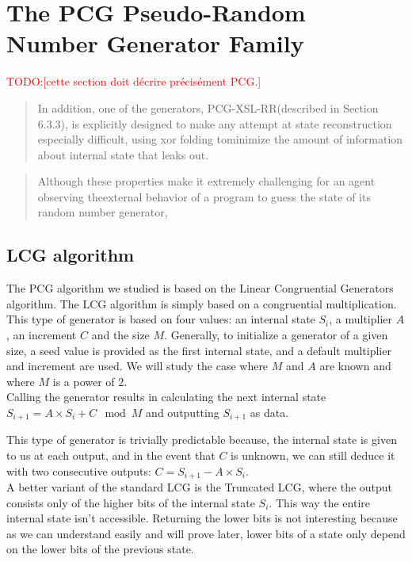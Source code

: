 \documentclass[preprint]{iacrtrans}
\newcommand{\todo}[1]{\textcolor{red}{TODO:[#1]}}
\begin{document}
\section{The PCG Pseudo-Random Number Generator Family}

\todo{cette section doit décrire précisément PCG.}

\begin{quote}
  In addition, one of the generators, PCG-XSL-RR(described in Section 6.3.3), is
  explicitly designed to make any attempt at state reconstruction especially
  difficult, using xor folding tominimize the amount of information about
  internal state that leaks out.
\end{quote}

\begin{quote}
  Although these properties make it extremely challenging for an agent observing
  theexternal behavior of a program to guess the state of its random number
  generator,
\end{quote}


\subsection{LCG algorithm}

The PCG algorithm we studied is based on the Linear Congruential Generators algorithm. The LCG algorithm is simply based on a congruential multiplication. This type of generator is based on four values: an internal state $S_{i}$, a multiplier $A$, an increment $C$ and the size $M$. Generally, to initialize a generator of a given size, a seed value is provided as the first internal state, and a default multiplier and increment are used. We will study the case where $M$ and $A$ are known and where $M$ is a power of 2.\\

Calling the generator results in calculating the next internal state $S_{i+1} = A \times S_i + C \mod{M}$ and outputting $S_{i+1}$ as data.

This type of generator is trivially predictable because, the internal state is given to us at each output, and in the event that $C$ is unknown, we can still deduce it with two consecutive outputs: $C = S_{i+1} - A \times S_i$.\\

A better variant of the standard LCG is the Truncated LCG, where the output consists only of the higher bits of the internal state $S_i$. This way the entire internal state isn't accessible. Returning the lower bits is not interesting because as we can understand easily and will prove later, lower bits of a state only depend on the lower bits of the previous state.
\end{document}
